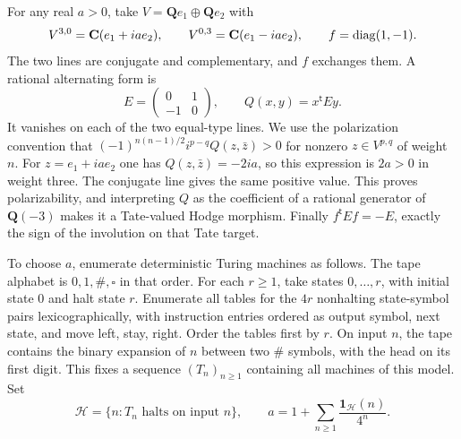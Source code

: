 \documentclass[11pt]{article}
\theoremstyle{definition}\newtheorem{definition}[theorem]{Definition}
\theoremstyle{remark}\newtheorem{remark}[theorem]{Remark}
\newcommand{\Q}{\mathbf Q}\newcommand{\Z}{\mathbf Z}
\begin{document}
For any real $a>0$, take $V=\Q e_1\oplus\Q e_2$ with
\[
 V^{3,0}=\mathbf C(e_1+ia e_2),\qquad
 V^{0,3}=\mathbf C(e_1-ia e_2),\qquad
 f=\operatorname{diag}(1,-1).
\]
The two lines are conjugate and complementary, and $f$ exchanges them. A rational alternating form is
\[
 E=\begin{pmatrix}0&1\\-1&0\end{pmatrix},\qquad
 Q(x,y)=x^{\mathsf t}Ey.
\]
It vanishes on each of the two equal-type lines. We use the polarization convention that
$(-1)^{n(n-1)/2}i^{p-q}Q(z,\bar z)>0$ for nonzero $z\in V^{p,q}$ of weight $n$.
For $z=e_1+ia e_2$ one has $Q(z,\bar z)=-2ia$, so this expression is $2a>0$ in weight three. The conjugate line gives the same positive value. This proves polarizability, and interpreting $Q$ as the coefficient of a rational generator of $\Q(-3)$ makes it a Tate-valued Hodge morphism. Finally $f^{\mathsf t}Ef=-E$, exactly the sign of the involution on that Tate target.

To choose $a$, enumerate deterministic Turing machines as follows. The tape alphabet is $0,1,\#,\square$ in that order. For each $r\ge1$, take states $0,\ldots,r$, with initial state $0$ and halt state $r$. Enumerate all tables for the $4r$ nonhalting state-symbol pairs lexicographically, with instruction entries ordered as output symbol, next state, and move left, stay, right. Order the tables first by $r$. On input $n$, the tape contains the binary expansion of $n$ between two $\#$ symbols, with the head on its first digit. This fixes a sequence $(T_n)_{n\ge1}$ containing all machines of this model. Set
\[
 \mathcal H=\{n:T_n\text{ halts on input }n\},\qquad
 a=1+\sum_{n\ge1}\frac{\mathbf1_{\mathcal H}(n)}{4^n}.
\]
\end{document}
